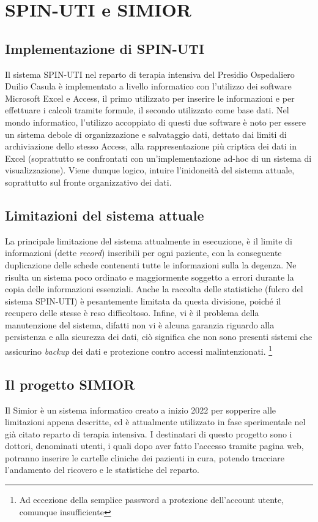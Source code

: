 \chapter{SPIN-UTI e SIMIOR}
\section{Implementazione di SPIN-UTI}
Il sistema SPIN-UTI nel reparto di terapia intensiva del Presidio Ospedaliero Duilio Casula è implementato a livello informatico con l'utilizzo dei software Microsoft Excel e Access, il primo utilizzato per inserire le informazioni e per effettuare i calcoli tramite formule, il secondo utilizzato come base dati.
Nel mondo informatico, l'utilizzo accoppiato di questi due software è noto per essere un sistema debole di organizzazione e salvataggio dati, dettato dai limiti di archiviazione dello stesso Access, alla rappresentazione più criptica dei dati in Excel (soprattutto se confrontati con un'implementazione ad-hoc di un sistema di visualizzazione).
Viene dunque logico, intuire l'inidoneità del sistema attuale, soprattutto sul fronte organizzativo dei dati.
\section{Limitazioni del sistema attuale}
La principale limitazione del sistema attualmente in esecuzione, è il limite di informazioni (dette \textit{record}) inseribili per ogni paziente, con la conseguente duplicazione delle schede contenenti tutte le informazioni sulla la degenza. 
Ne risulta un sistema poco ordinato e maggiormente soggetto a errori durante la copia delle informazioni essenziali.
Anche la raccolta delle statistiche (fulcro del sistema SPIN-UTI) è pesantemente limitata da questa divisione, poiché il recupero delle stesse è reso difficoltoso.
Infine, vi è il problema della manutenzione del sistema, difatti non vi è alcuna garanzia riguardo alla persistenza e alla sicurezza dei dati, ciò significa che non sono presenti sistemi che assicurino \textit{backup} dei dati e protezione contro accessi malintenzionati. \footnote{Ad eccezione della semplice password a protezione dell'account utente, comunque insufficiente}
\section{Il progetto SIMIOR}
Il Simior è un sistema informatico creato a inizio 2022 per sopperire alle limitazioni appena descritte, ed è attualmente utilizzato in fase sperimentale nel già citato reparto di terapia intensiva.
I destinatari di questo progetto sono i dottori, denominati utenti, i quali dopo aver fatto l'accesso tramite pagina web, potranno inserire le cartelle cliniche dei pazienti in cura, potendo tracciare l'andamento del ricovero e le statistiche del reparto.
